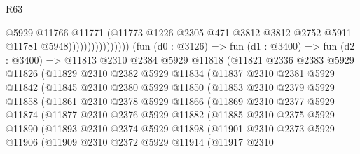 \begin{lexlean}{R63}
\begin{coremodule}
                                      @5929
                                      @11766
                                      @11771
                                      (@11773
                                        @1226
                                        @2305
                                        @471
                                        @3812
                                        @3812
                                        @2752
                                        @5911
                                        @11781
                                        @5948))))))))))))))))
        (fun (d0 : @3126) =>
        fun (d1 : @3400) =>
        fun (d2 : @3400) =>
        @11813
          @2310
          @2384
          @5929
          @11818
          (@11821
            @2336
            @2383
            @5929
            @11826
            (@11829
              @2310
              @2382
              @5929
              @11834
              (@11837
                @2310
                @2381
                @5929
                @11842
                (@11845
                  @2310
                  @2380
                  @5929
                  @11850
                  (@11853
                    @2310
                    @2379
                    @5929
                    @11858
                    (@11861
                      @2310
                      @2378
                      @5929
                      @11866
                      (@11869
                        @2310
                        @2377
                        @5929
                        @11874
                        (@11877
                          @2310
                          @2376
                          @5929
                          @11882
                          (@11885
                            @2310
                            @2375
                            @5929
                            @11890
                            (@11893
                              @2310
                              @2374
                              @5929
                              @11898
                              (@11901
                                @2310
                                @2373
                                @5929
                                @11906
                                (@11909
                                  @2310
                                  @2372
                                  @5929
                                  @11914
                                  (@11917
                                    @2310

\end{coremodule}
\end{lexlean}
